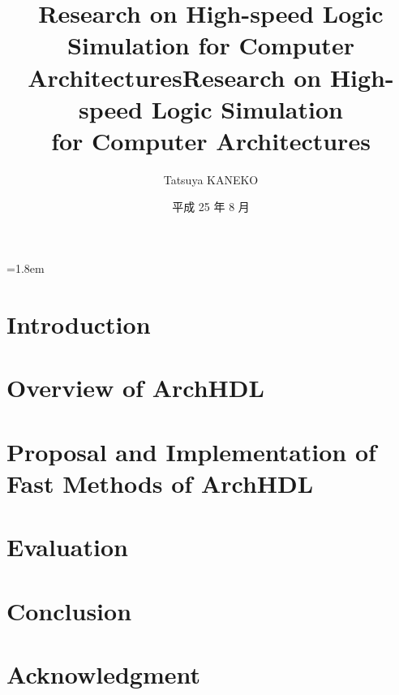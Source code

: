 \documentclass[12pt,openany,papersize,english]{jsbook}
\title{Research on High-speed Logic Simulation for Computer Architectures}
\affiliation{Department of Computer Science}
\title{Research on High-speed Logic Simulation \\ for Computer Architectures}
\author{Tatsuya KANEKO}
\date{平成 25 年 8 月}
\begin{document}
\maketitle
\parindent=1.8em
\frontmatter

\tableofcontents

\mainmatter

\frenchspacing
\sloppy

\chapter{Introduction}




% 

\chapter{Overview of ArchHDL}

\label{c:summary}



\chapter{Proposal and Implementation of Fast Methods of ArchHDL}

\label{c:method}



\chapter{Evaluation}

\label{c:evaluation}



\chapter{Conclusion}

\label{c:conclusion}



\backmatter

\nonfrenchspacing

\chapter{Acknowledgment}

\label{c:acknowledgment}



\label{c:relatedwork}


\end{document}
